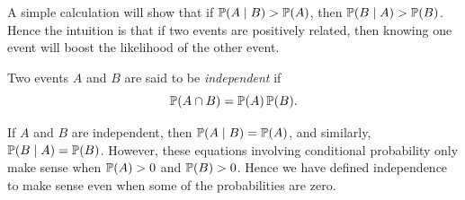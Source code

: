A simple calculation will show that if $\operatorname{\mathbb{P}}(A \mid B) > \operatorname{\mathbb{P}}(A)$, then $\operatorname{\mathbb{P}}(B \mid A) > \operatorname{\mathbb{P}}(B)$. Hence the intuition is that if two events are positively related, then knowing one event will boost the likelihood of the other event.

\begin{definition}
  Two events $A$ and $B$ are said to be \emph{independent} if \[
    \operatorname{\mathbb{P}}(A \cap B) = \operatorname{\mathbb{P}}(A) \operatorname{\mathbb{P}}(B).
  \] 
\end{definition}

If $A$ and $B$ are independent, then $\operatorname{\mathbb{P}}(A \mid B) = \operatorname{\mathbb{P}}(A)$, and similarly, $\operatorname{\mathbb{P}}(B \mid A) = \operatorname{\mathbb{P}}(B)$. However, these equations involving conditional probability only make sense when $\operatorname{\mathbb{P}}(A) > 0$ and $\operatorname{\mathbb{P}}(B) > 0$. Hence we have defined independence to make sense even when some of the probabilities are zero.

